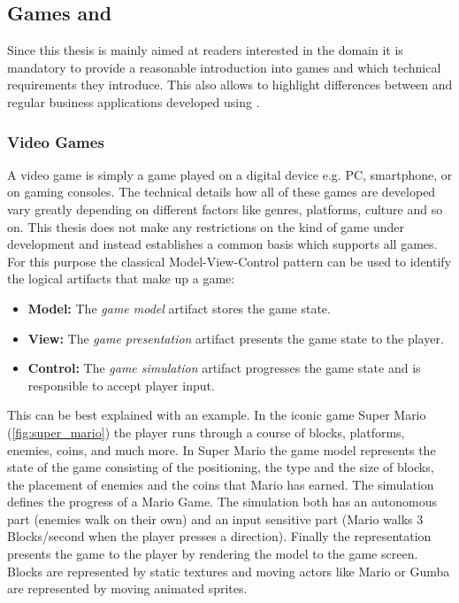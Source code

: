 \subsection{Games and \ogs{}}
\label{sub:games}

Since this thesis is mainly aimed at readers interested in the \ms{} domain it
is mandatory to provide a reasonable introduction into games and which technical
requirements they introduce. This also allows to highlight differences between
\ogs{} and regular business applications developed using \mss{}.

\subsubsection{Video Games}

A video game is simply a game played on a digital device e.g. PC, smartphone, or
on gaming consoles. The technical details how all of these games are developed
vary greatly depending on different factors like genres, platforms, culture
and so on. This thesis does not make any restrictions on the kind of game
under development and instead establishes a common basis which supports all
games. For this purpose the classical Model-View-Control pattern can be used to
identify the logical artifacts that make up a game: 

\begin{itemize}
  \item \textbf{Model:} The \textit{game model} artifact stores the game state.
  \item \textbf{View:} The \textit{game presentation} artifact presents the game
  state to the player.
  \item \textbf{Control:} The \textit{game simulation} artifact progresses the
  game state and is responsible to accept player input.
\end{itemize}

This can be best explained with an example. In the iconic game Super Mario
(\autoref{fig:super_mario}) the player runs through a course of blocks,
platforms, enemies, coins, and much more. In Super Mario the game model
represents the state of the game consisting of the positioning, the type and the
size of blocks, the placement of enemies and the coins that Mario has earned.
The simulation defines the progress of a Mario Game. The simulation both has an
autonomous part (enemies walk on their own) and an input sensitive part (Mario
walks 3 Blocks/second when the player presses a direction). Finally the
representation presents the game to the player by rendering the model to the
game screen. Blocks are represented by static textures and moving actors like
Mario or Gumba are represented by moving animated \glspl{sprite}.

